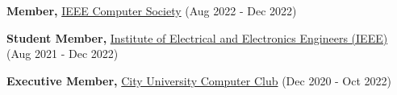 
\begin{cvlistsection}
\item \textbf{Member,} \href{https://www.computer.org/}{IEEE Computer Society} (Aug 2022 - Dec 2022)
\item \textbf{Student Member,} \href{https://www.ieee.org/}{Institute of Electrical and Electronics Engineers (IEEE)} (Aug 2021 - Dec 2022)
\item \textbf{Executive Member,} \href{https://cityuniversity.ac.bd/}{City University Computer Club} (Dec 2020 - Oct 2022)
\end{cvlistsection}
